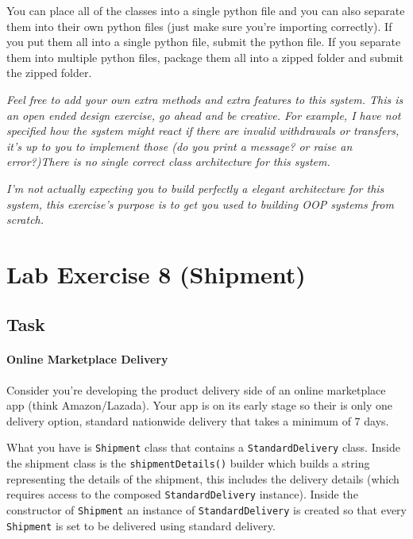 You can place all of the classes into a single python file and you can
also separate them into their own python files (just make sure you're
importing correctly). If you put them all into a single python file,
submit the python file. If you separate them into multiple python files,
package them all into a zipped folder and submit the zipped folder.

\emph{Feel free to add your own extra methods and extra features to this
system. This is an open ended design exercise, go ahead and be creative.
For example, I have not specified how the system might react if there
are invalid withdrawals or transfers, it's up to you to implement those
(do you print a message? or raise an error?)There is no single correct
class architecture for this system.}

\emph{I'm not actually expecting you to build perfectly a elegant
architecture for this system, this exercise's purpose is to get you used
to building OOP systems from scratch.}

\chapter{Lab Exercise 8
(Shipment)}\label{lab-exercise-8-shipment.md__lab-exercise-8-shipment}

\section{Task}\label{lab-exercise-8-shipment.md__task}

\subsubsection{Online Marketplace
Delivery}\label{lab-exercise-8-shipment.md__online-marketplace-delivery}

Consider you're developing the product delivery side of an online
marketplace app (think Amazon/Lazada). Your app is on its early stage so
their is only one delivery option, standard nationwide delivery that
takes a minimum of 7 days.

What you have is \texttt{Shipment} class that contains a
\texttt{StandardDelivery} class. Inside the shipment class is the
\texttt{shipmentDetails()} builder which builds a string representing
the details of the shipment, this includes the delivery details (which
requires access to the composed \texttt{StandardDelivery} instance).
Inside the constructor of \texttt{Shipment} an instance of
\texttt{StandardDelivery} is created so that every \texttt{Shipment} is
set to be delivered using standard delivery.

